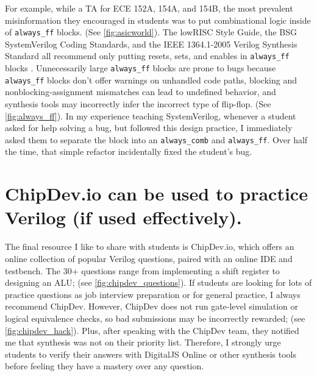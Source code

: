 


For example, while a TA for ECE 152A, 154A, and 154B, the most prevalent misinformation they encouraged in students was to put combinational logic inside of \texttt{always_ff} blocks. (See \autoref{fig:asicworld}). The lowRISC Style Guide, the BSG SystemVerilog Coding Standards, and the IEEE 1364.1-2005 Verilog Synthesis Standard all recommend only putting resets, sets, and enables in \texttt{always_ff} blocks \cite{lowRISCstyleguides, BSGstyleguide, 1364.1-2005}. Unnecessarily large \texttt{always_ff} blocks are prone to bugs because \texttt{always_ff} blocks don't offer warnings on unhandled code paths, blocking and nonblocking-assignment mismatches can lead to undefined behavior, and synthesis tools may incorrectly infer the incorrect type of flip-flop. (See \autoref{fig:always_ff}). In my experience teaching SystemVerilog, whenever a student asked for help solving a bug, but followed this design practice, I immediately asked them to separate the block into an \texttt{always_comb} and \texttt{always_ff}. Over half the time, that simple refactor incidentally fixed the student's bug.

\FloatBarrier

\section{ChipDev.io can be used to practice Verilog (if used effectively).}




The final resource I like to share with students is ChipDev.io, which offers an online collection of popular Verilog questions, paired with an online IDE and testbench. The 30+ questions range from implementing a shift register to designing an ALU; (see \autoref{fig:chipdev_questions}). If students are looking for lots of practice questions as job interview preparation or for general practice, I always recommend ChipDev. However, ChipDev does not run gate-level simulation or logical equivalence checks, so bad submissions may be incorrectly rewarded; (see \autoref{fig:chipdev_hack}). Plus, after speaking with the ChipDev team, they notified me that synthesis was not on their priority list. Therefore, I strongly urge students to verify their answers with DigitalJS Online or other synthesis tools before feeling they have a mastery over any question.
